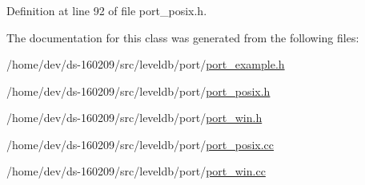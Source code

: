 \subsubsection[{Cond\+Var}]{\hspace{0.3cm}{\ttfamily [friend]}}\label{classleveldb_1_1port_1_1_mutex_a4c7086cb9e92b300d6d5c1eac180e075}


Definition at line 92 of file port\+\_\+posix.\+h.



The documentation for this class was generated from the following files\+:\begin{DoxyCompactItemize}
\item 
/home/dev/ds-\/160209/src/leveldb/port/\hyperlink{port__example_8h}{port\+\_\+example.\+h}\item 
/home/dev/ds-\/160209/src/leveldb/port/\hyperlink{port__posix_8h}{port\+\_\+posix.\+h}\item 
/home/dev/ds-\/160209/src/leveldb/port/\hyperlink{port__win_8h}{port\+\_\+win.\+h}\item 
/home/dev/ds-\/160209/src/leveldb/port/\hyperlink{port__posix_8cc}{port\+\_\+posix.\+cc}\item 
/home/dev/ds-\/160209/src/leveldb/port/\hyperlink{port__win_8cc}{port\+\_\+win.\+cc}\end{DoxyCompactItemize}
